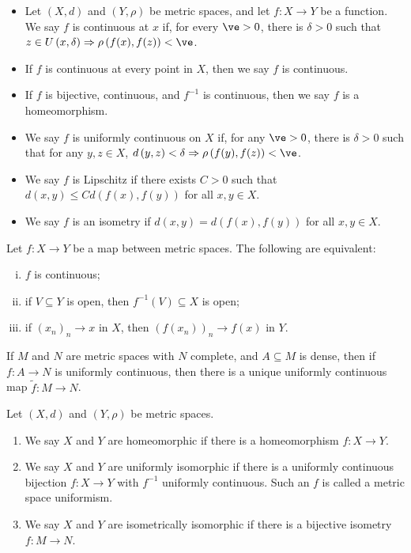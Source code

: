 \begin{definition}[Continuity]
  \begin{itemize}
    \item Let $\left(X,d\right)$ and $\left(Y,\rho\right)$ be metric spaces, and let $f: X\rightarrow Y$ be a function. We say $f$ is continuous at $x$ if, for every $\ve > 0$, there is $\delta > 0$ such that $z\in U\left(x,\delta\right)\Rightarrow \rho\left(f(x),f(z)\right) < \ve$.
    \item If $f$ is continuous at every point in $X$, then we say $f$ is continuous.
    \item If $f$ is bijective, continuous, and $f^{-1}$ is continuous, then we say $f$ is a homeomorphism.
    \item We say $f$ is uniformly continuous on $X$ if, for any $\ve > 0$, there is $\delta > 0$ such that for any $y,z\in X$, $d\left(y,z\right) < \delta \Rightarrow \rho\left(f(y),f(z)\right) < \ve$.
    \item We say $f$ is Lipschitz if there exists $C > 0$ such that $d\left(x,y\right) \leq Cd\left(f(x),f(y)\right)$ for all $x,y\in X$.
    \item We say $f$ is an isometry if $d\left(x,y\right) = d\left(f(x),f(y)\right)$ for all $x,y\in X$.
  \end{itemize}
\end{definition}
\begin{fact}
  Let $f: X\rightarrow Y$ be a map between metric spaces. The following are equivalent:
  \begin{enumerate}[(i)]
    \item $f$ is continuous;
    \item if $V\subseteq Y$ is open, then $f^{-1}\left(V\right)\subseteq X$ is open;
    \item if $\left(x_n\right)_n\rightarrow x$ in $X$, then $\left(f\left(x_n\right)\right)_n\rightarrow f(x)$ in $Y$.
  \end{enumerate}
\end{fact}
\begin{fact}
  If $M$ and $N$ are metric spaces with $N$ complete, and $A\subseteq M$ is dense, then if $f: A\rightarrow N$ is uniformly continuous, then there is a unique uniformly continuous map $\tilde{f}: M\rightarrow N$.
\end{fact}
\begin{definition}
  Let $\left(X,d\right)$ and $\left(Y,\rho\right)$ be metric spaces.
  \begin{enumerate}[(1)]
    \item We say $X$ and $Y$ are homeomorphic if there is a homeomorphism $f: X\rightarrow Y$.
    \item We say $X$ and $Y$ are uniformly isomorphic if there is a uniformly continuous bijection $f: X\rightarrow Y$ with $f^{-1}$ uniformly continuous. Such an $f$ is called a metric space uniformism.
    \item We say $X$ and $Y$ are isometrically isomorphic if there is a bijective isometry $f: M\rightarrow N$.
  \end{enumerate}
\end{definition}
